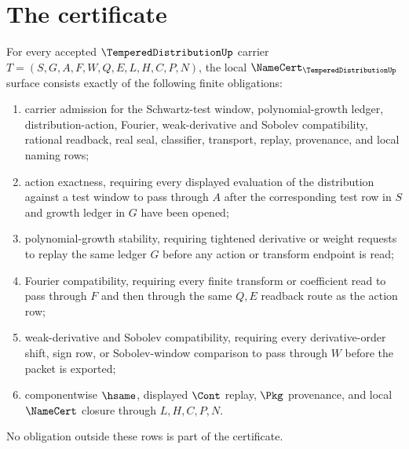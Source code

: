 \section{The certificate}
\label{sec:tempered-distribution-certificate}

\begin{theorem}
\label{thm:tempered-distribution-namecert-obligations}
For every accepted $\TemperedDistributionUp$ carrier $T=(S,G,A,F,W,Q,E,L,H,C,P,N)$, the local $\NameCert_{\TemperedDistributionUp}$ surface consists exactly of the following finite obligations:
\begin{enumerate}
\item carrier admission for the Schwartz-test window, polynomial-growth ledger, distribution-action, Fourier, weak-derivative and Sobolev compatibility, rational readback, real seal, classifier, transport, replay, provenance, and local naming rows;
\item action exactness, requiring every displayed evaluation of the distribution against a test window to pass through $A$ after the corresponding test row in $S$ and growth ledger in $G$ have been opened;
\item polynomial-growth stability, requiring tightened derivative or weight requests to replay the same ledger $G$ before any action or transform endpoint is read;
\item Fourier compatibility, requiring every finite transform or coefficient read to pass through $F$ and then through the same $Q,E$ readback route as the action row;
\item weak-derivative and Sobolev compatibility, requiring every derivative-order shift, sign row, or Sobolev-window comparison to pass through $W$ before the packet is exported;
\item componentwise $\hsame$, displayed $\Cont$ replay, $\Pkg$ provenance, and local $\NameCert$ closure through $L,H,C,P,N$.
\end{enumerate}
No obligation outside these rows is part of the certificate.
\end{theorem}
